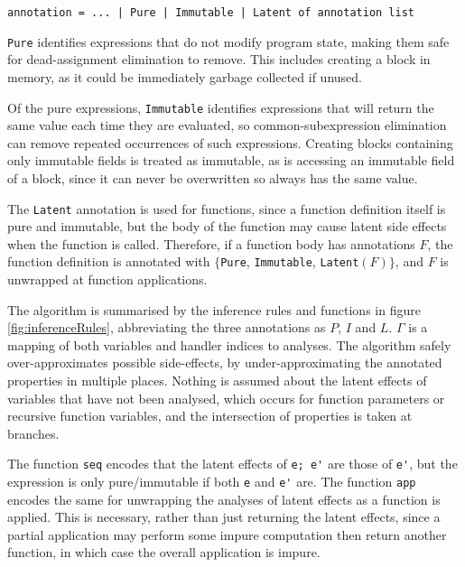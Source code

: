 \verb"annotation = ... | Pure | Immutable | Latent of annotation list"

\verb|Pure| identifies expressions that do not modify program state, making them safe for dead-assignment elimination to remove. This includes creating a block in memory, as it could be immediately garbage collected if unused.

Of the pure expressions, \verb|Immutable| identifies expressions that will return the same value each time they are evaluated, so common-subexpression elimination can remove repeated occurrences of such expressions. Creating blocks containing only immutable fields is treated as immutable, as is accessing an immutable field of a block, since it can never be overwritten so always has the same value.

The \verb|Latent| annotation is used for functions, since a function definition itself is pure and immutable, but the body of the function may cause latent side effects when the function is called. Therefore, if a function body has annotations $F$, the function definition is annotated with $\{$\verb|Pure|, \verb|Immutable|,  \verb|Latent|$(F) \}$, and $F$ is unwrapped at function applications.


The algorithm is summarised by the inference rules and functions in figure \ref{fig:inferenceRules}, abbreviating the three annotations as $P$, $I$ and $L$. $\Gamma$ is a mapping of both variables and handler indices to analyses. 
The algorithm safely over-approximates possible side-effects, by under-approximating the annotated properties in multiple places. 
Nothing is assumed about the latent effects of variables that have not been analysed, which occurs for function parameters or recursive function variables,
 and the intersection of properties is taken at branches.

The function \verb|seq| encodes that the latent effects of \verb|e; e'| are those of \verb|e'|, but the expression is only pure/immutable if both \verb|e| and \verb|e'| are. The function \verb|app| encodes the same for unwrapping the analyses of latent effects as a function is applied. This is necessary, rather than just returning the latent effects, since a partial application may perform some impure computation then return another function, in which case the overall application is impure.


